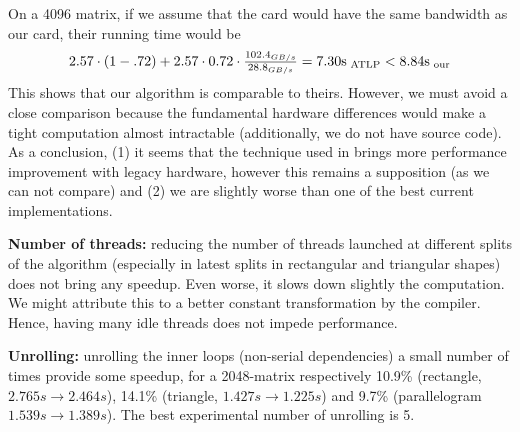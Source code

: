 \item On a 4096 matrix, if we assume that the \cite{gpu_atlp} card would have the same bandwidth as our card, their running time would be
\[2.57 \cdot (1-.72) + 2.57 \cdot 0.72 \cdot \tfrac{102.4_{GB/s}}{28.8_{GB/s}} = 7.30\rm s_{\text{ ATLP}} < 8.84\rm s_{\text{ our}}\]
This shows that our algorithm is comparable to theirs. However, we must avoid a close comparison because the fundamental hardware differences would make a tight computation almost intractable (additionally, we do not have \cite{gpu_atlp} source code).
\ule
As a conclusion, (1) it seems that the technique used in \cite{gpu_atlp} brings more performance improvement with legacy hardware, however this remains a supposition (as we can not compare) and (2) we are slightly worse than one of the best current implementations.

\item \textbf{Number of threads:} reducing the number of threads launched at different splits of the algorithm (especially in latest splits in rectangular and triangular shapes) does not bring any speedup. Even worse, it slows down slightly the computation. We might attribute this to a better constant transformation by the compiler. Hence, having many idle threads does not impede performance.

\item \textbf{Unrolling:} unrolling the inner loops (non-serial dependencies) a small number of times provide some speedup, for a 2048-matrix respectively 10.9\% (rectangle, $2.765s\to 2.464s$), 14.1\% (triangle, $1.427s\to 1.225s$) and 9.7\% (parallelogram $1.539s\to 1.389s$). The best experimental number of unrolling is 5.
\ule

